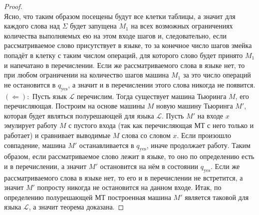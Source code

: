 \documentclass[11pt]{article}
\begin{document}
\begin{proof}
     \leavevmode
    \\
    Ясно, что таким образом посещены будут все клетки таблицы, а значит для каждого слова над $\Sigma$ будет запущена $M_1$ на всех возможных ограничениях количества выполняемых ею на этом входе шагов и, следовательно, если рассматриваемое слово присутствует в языке, то за конечное число шагов змейка попадёт в клетку с таким числом операций, для которого слово будет принято $M_1$ и напечатано в перечислении. Если же рассматриваемого слова в языке нет, то при любом ограничении на количество шагов машина $M_1$ за это число операций не остановится в $q_{\text{yes}}$, а значит и в перечислении этого слова никогда не появится. \\
    $(\Longleftarrow):$ Пусть язык $\mathcal{L}$ перечислим. Тогда существует машина Тьюринга $M$, его перечисляющая. Построим на основе машины $M$ новую машину Тьюринга $M'$, которая будет являться полурешающей для языка $\mathcal{L}$. Пусть $M'$ на входе $x$ эмулирует работу $M$ с пустого входа (так как перечисляющая МТ с него только и работает) и сравнивает выводимые $M$ слова со словом $x$. Если произошло совпадение, машина $M'$ останавливается в $q_{\text{yes}}$, иначе продолжает работу. Таким образом, если рассматриваемое слово лежит в языке, то оно по определению есть и в перечислении, а значит $M'$ остановится на нём в состоянии $q_{\text{yes}}$. Если же рассматриваемого слова в языке нет, то его и в перечислении не встретится, а значит $M'$ попросту никогда не остановится на данном входе. Итак, по определению полурешающей МТ построенная машина $M'$ является таковой для языка $\mathcal{L}$, а значит теорема доказана.
\end{proof} \leavevmode
\end{document}
